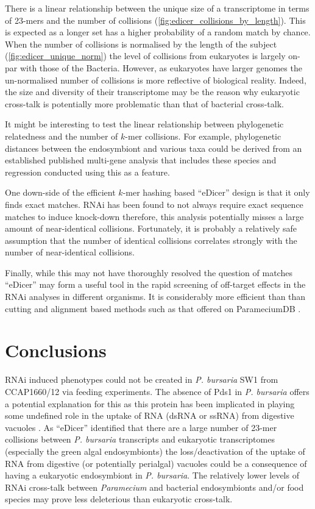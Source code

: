 There is a linear relationship between the unique size of a transcriptome
in terms of 23-mers and the number of collisions (\cref{fig:edicer_collisions_by_length}).  
This is expected
as a longer set has a higher probability of a random match by chance.
When the number of collisions is normalised by the length of the subject (\cref{fig:edicer_unique_norm})
the level of collisions from eukaryotes is largely on-par with
those of the Bacteria.  However, as eukaryotes have larger genomes
the un-normalised number of collisions is more reflective of biological
reality.  Indeed, the size and diversity of their transcriptome
may be the reason why eukaryotic cross-talk is potentially
more problematic than that of bacterial cross-talk.


It might be interesting to test the linear relationship between phylogenetic
relatedness and the number of \(k\)-mer collisions.  For example, phylogenetic distances
between the endosymbiont and various taxa could be derived from an established
published multi-gene analysis that includes these species and regression
conducted using this as a feature. 

One down-side of the efficient \(k\)-mer hashing based ``eDicer'' design is that
it only finds exact matches.  RNAi has been found to not always require exact
sequence matches to induce knock-down \citep{Elbashir2001} therefore,
this analysis potentially misses a large amount of near-identical collisions.
Fortunately, it is probably a relatively safe assumption that the number
of identical collisions correlates strongly with the number of near-identical collisions.

Finally, while this may not have thoroughly resolved the question of matches
``eDicer'' may form a useful tool in the rapid screening of off-target effects
in the RNAi analyses in different organisms.   It is considerably
more efficient than than cutting and alignment based methods such as that
offered on ParameciumDB \citep{Arnaiz2011}.

\section{Conclusions}

RNAi induced phenotypes could not be created in \textit{P. bursaria} SW1 from CCAP1660/12
via feeding experiments.  The absence of Pds1 in \textit{P. bursaria} offers a potential 
explanation for this as this protein has been implicated in playing some undefined role
in the uptake of RNA (dsRNA or ssRNA) from digestive vacuoles \citep{Carradec2015}.
As ``eDicer'' identified that there are a large number of 23-mer collisions
between \textit{P. bursaria} transcripts and eukaryotic transcriptomes (especially
the green algal endosymbionts) the loss/deactivation of the uptake of RNA from 
digestive (or potentially perialgal) vacuoles could be a consequence of 
having a eukaryotic endosymbiont in \textit{P. bursaria}.  
The relatively lower levels of RNAi cross-talk between
\textit{Paramecium} and bacterial endosymbionts and/or food species may prove
less deleterious than eukaryotic cross-talk. 

